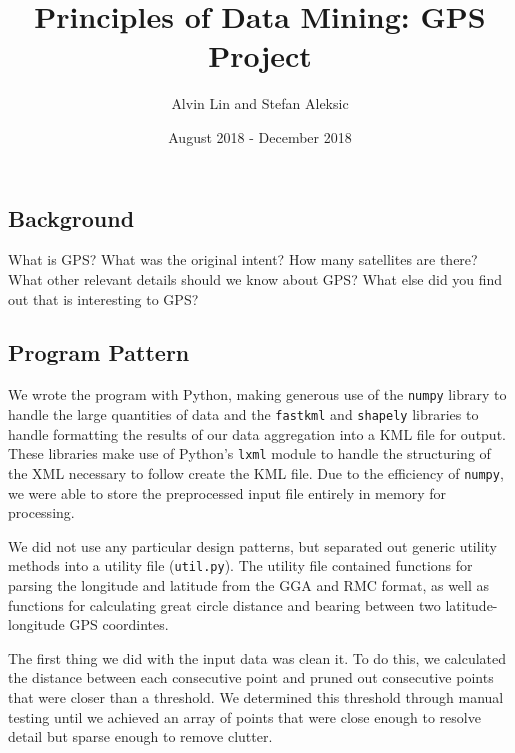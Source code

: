 \documentclass{math}
\title{Principles of Data Mining: GPS Project}
\author{Alvin Lin and Stefan Aleksic}
\date{August 2018 - December 2018}
\begin{document}
\maketitle

\subsection*{Background}
What is GPS?
What was the original intent?
How many satellites are there?
What other relevant details should we know about GPS?
What else did you find out that is interesting to GPS?

\subsection*{Program Pattern}
We wrote the program with Python, making generous use of the \texttt{numpy}
library to handle the large quantities of data and the \texttt{fastkml} and
\texttt{shapely} libraries to handle formatting the results of our data
aggregation into a KML file for output. These libraries make use of Python's
\texttt{lxml} module to handle the structuring of the XML necessary to follow
create the KML file. Due to the efficiency of \texttt{numpy}, we were able to
store the preprocessed input file entirely in memory for processing. \par
We did not use any particular design patterns, but separated out generic utility
methods into a utility file (\texttt{util.py}). The utility file contained
functions for parsing the longitude and latitude from the GGA and RMC format, as
well as functions for calculating great circle distance and bearing between
two latitude-longitude GPS coordintes. \par
The first thing we did with the input data was clean it. To do this, we
calculated the distance between each consecutive point and pruned out
consecutive points that were closer than a threshold. We determined this
threshold through manual testing until we achieved an array of points that
were close enough to resolve detail but sparse enough to remove clutter. \par
\end{document}
